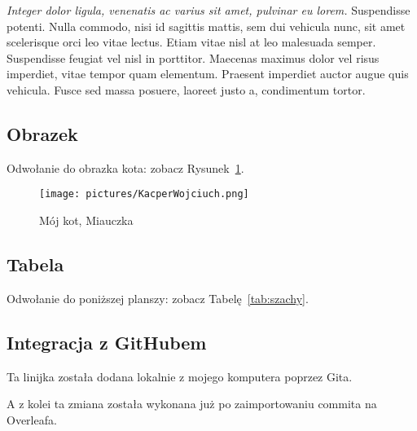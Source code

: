 \textit{Integer dolor ligula, venenatis ac varius sit amet, pulvinar eu lorem.} Suspendisse potenti. Nulla commodo, nisi id sagittis mattis, sem dui vehicula nunc, sit amet scelerisque orci leo vitae lectus. Etiam vitae nisl at leo malesuada semper. Suspendisse feugiat vel nisl in porttitor. Maecenas maximus dolor vel risus imperdiet, vitae tempor quam elementum. Praesent imperdiet auctor augue quis vehicula. Fusce sed massa posuere, laoreet justo a, condimentum tortor.

\subsection{Obrazek}
Odwołanie do obrazka kota: zobacz Rysunek~\ref{fig:miauczka}.
\begin{figure}[htbp]
    \centering
    \texttt{[image: pictures/KacperWojciuch.png]}
    \caption{Mój kot, Miauczka}
    \label{fig:miauczka}
\end{figure}

\subsection{Tabela}
Odwołanie do poniższej planszy: zobacz Tabelę~\ref{tab:szachy}.


\subsection{Integracja z GitHubem}
Ta linijka została dodana lokalnie z mojego komputera poprzez Gita.

A z kolei ta zmiana została wykonana już po zaimportowaniu commita na Overleafa.
